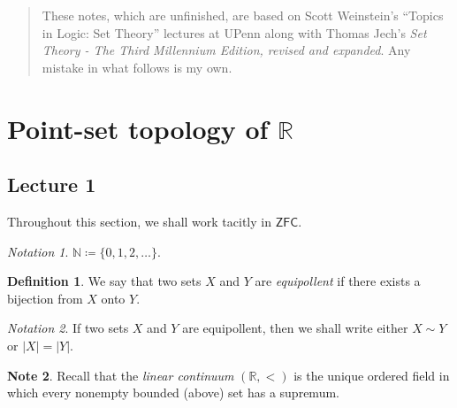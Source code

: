 \documentclass[10pt,letterpaper,cm]{nupset}
\theoremstyle{definition}
\newtheorem{definition}{Definition}[subsection]
\newtheorem{note}[definition]{Note}
\theoremstyle{theorem}
\theoremstyle{remark}
\newtheorem*{notation}{Notation}
\newcommand{\N}{\mathbb N}
\newcommand{\R}{\mathbb R}
\newcommand{\1}{\mathbf{1}}
\newcommand{\0}{\vec 0}
\newcommand{\zfc}{\mathsf{ZFC}}
\begin{document}
\thispagestyle{empty}
\begin{abstract}
These notes, which are unfinished, are based on Scott Weinstein's ``Topics in Logic: Set Theory'' lectures at UPenn along with  Thomas Jech's \textit{Set Theory - The Third Millennium Edition, revised and expanded}. Any mistake in what follows is my own.
\end{abstract}

\tableofcontents
\newpage

\section{Point-set topology of $\R$}

\subsection{Lecture 1}

Throughout this section, we shall  work tacitly in $\zfc$.

\begin{notation}
$\N \coloneqq \{0,1,2, \ldots \}$.
\end{notation}

\begin{definition}
We say that two sets $X$ and $Y$ are \textit{equipollent} if there exists a bijection from $X$ onto $Y$. 
\end{definition}

\begin{notation}
If two sets $X$ and $Y$ are equipollent, then we shall write either $X \sim Y$ or $\left\lvert{X}\right\rvert = \left\lvert{Y}\right\rvert$.
\end{notation}

\begin{note}
Recall that the \textit{linear continuum} $\left(\R, <\right)$ is the unique ordered field in which every nonempty bounded (above) set has a supremum.  
\end{note}
\end{document}

